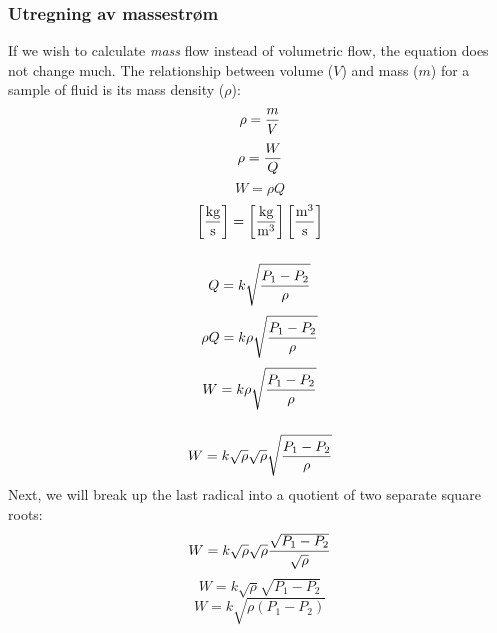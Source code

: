 \documentclass{beamer}
\begin{document}
%
\begin{frame}
	\frametitle{Utregning av massestrøm}

	


%
If we wish to calculate \textit{mass} flow instead of volumetric flow, the equation does not change much.  The relationship between volume ($V$) and mass ($m$) for a sample of fluid is its mass density ($\rho$):
%
$$\rho = {m \over V}$$
%
%
$$\rho = {W \over Q}$$
%
%
$$W = \rho Q$$
%
%
$$\left[\hbox{kg} \over \hbox{s}\right] = \left[{\hbox{kg} \over \hbox{m}^3}\right] \left[{\hbox{m}^3 \over \hbox{s} }\right]$$
%
\end{frame}
\begin{frame}
	\frametitle{ }

	

%
%
$$Q = k \sqrt{{P_1 - P_2} \over \rho}$$
%
$$\rho Q = k \rho \sqrt{{P_1 - P_2} \over \rho}$$
%
$$W = k \rho \sqrt{{P_1 - P_2} \over \rho}$$
	\end{frame}
%

	\begin{frame}
		\frametitle{}

		


%
$$W = k \sqrt{\rho} \sqrt{\rho} \sqrt{{P_1 - P_2} \over \rho}$$
%
Next, we will break up the last radical into a quotient of two separate square roots:
%
$$W = k \sqrt{\rho} \sqrt{\rho} {\sqrt{P_1 - P_2} \over \sqrt{\rho}}$$
%
%
$$W = k \sqrt{\rho} \sqrt{P_1 - P_2}$$
%
$$W = k \sqrt{\rho(P_1 - P_2)}$$
\end{frame}
\end{document}
